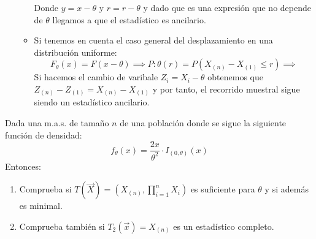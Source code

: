 \begin{sol}
\begin{enumerate}
\begin{itemize}
			Donde $y = x - \theta$ y $r = r - \theta$ y dado que es una expresión que no depende de $\theta$ llegamos a que el estadístico es ancilario. 
			\item Si tenemos en cuenta el caso general del desplazamiento en una distribución uniforme: $$F_{\theta}(x) = F(x - \theta)  \implies P:{\theta}(r) = P(X_{(n)} - X_{(1)} \leq r) \implies$$
			Si hacemos el cambio de varibale $Z_i = X_i - \theta$ obtenemos que $Z_{(n)} - Z_{(1)} = X_{(n)} - X_{(1)}$ y por tanto, el recorrido muestral sigue siendo un estadístico ancilario.  
		\end{itemize}
	\end{enumerate}
\end{sol}
\begin{problem}{2.8}
	Dada una m.a.s. de tamaño $n$ de una población donde se sigue la siguiente función de densidad: 
	$$f_{\theta}(x) = \frac{2x}{\theta^2}\cdot I_{(0, \theta)}(x)$$
	Entonces: 
	\begin{enumerate}
		\item Comprueba si $T(\vec{X}) = (X_{(n)}, \prod_{i = 1}^{n}X_i)$ es suficiente para $\theta$ y si además es minimal. 
		\item Comprueba también si $T_2(\vec{x}) = X_{(n)}$ es un estadístico completo. 
	\end{enumerate}
\end{problem}
